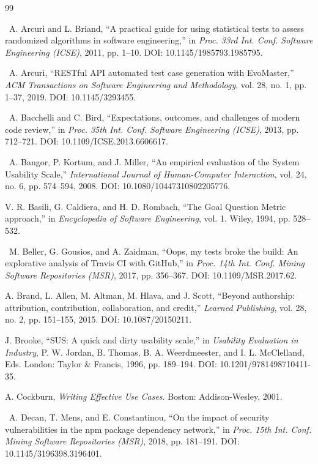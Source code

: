 \begin{thebibliography}{99}
\setlength{\itemsep}{4pt}

\dag\ A. Arcuri and L. Briand, ``A practical guide for using statistical tests to assess randomized algorithms in software engineering,'' in \textit{Proc. 33rd Int. Conf. Software Engineering (ICSE)}, 2011, pp. 1--10. DOI: 10.1145/1985793.1985795.

\dag\ A. Arcuri, ``RESTful API automated test case generation with EvoMaster,'' \textit{ACM Transactions on Software Engineering and Methodology}, vol. 28, no. 1, pp. 1--37, 2019. DOI: 10.1145/3293455.

\dag\ A. Bacchelli and C. Bird, ``Expectations, outcomes, and challenges of modern code review,'' in \textit{Proc. 35th Int. Conf. Software Engineering (ICSE)}, 2013, pp. 712--721. DOI: 10.1109/ICSE.2013.6606617.

\dag\ A. Bangor, P. Kortum, and J. Miller, ``An empirical evaluation of the System Usability Scale,'' \textit{International Journal of Human-Computer Interaction}, vol. 24, no. 6, pp. 574--594, 2008. DOI: 10.1080/10447310802205776.

 V. R. Basili, G. Caldiera, and H. D. Rombach, ``The Goal Question Metric approach,'' in \textit{Encyclopedia of Software Engineering}, vol. 1. Wiley, 1994, pp. 528--532.

\dag\ M. Beller, G. Gousios, and A. Zaidman, ``Oops, my tests broke the build: An explorative analysis of Travis CI with GitHub,'' in \textit{Proc. 14th Int. Conf. Mining Software Repositories (MSR)}, 2017, pp. 356--367. DOI: 10.1109/MSR.2017.62.

 A. Brand, L. Allen, M. Altman, M. Hlava, and J. Scott, ``Beyond authorship: attribution, contribution, collaboration, and credit,'' \textit{Learned Publishing}, vol. 28, no. 2, pp. 151--155, 2015. DOI: 10.1087/20150211.

 J. Brooke, ``SUS: A quick and dirty usability scale,'' in \textit{Usability Evaluation in Industry}, P. W. Jordan, B. Thomas, B. A. Weerdmeester, and I. L. McClelland, Eds. London: Taylor \& Francis, 1996, pp. 189--194. DOI: 10.1201/9781498710411-35.

 A. Cockburn, \textit{Writing Effective Use Cases}. Boston: Addison-Wesley, 2001.

\dag\ A. Decan, T. Mens, and E. Constantinou, ``On the impact of security vulnerabilities in the npm package dependency network,'' in \textit{Proc. 15th Int. Conf. Mining Software Repositories (MSR)}, 2018, pp. 181--191. DOI: 10.1145/3196398.3196401.


\end{thebibliography}
